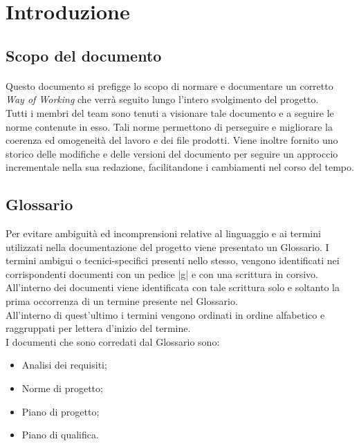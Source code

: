 \documentclass[10pt, a4paper]{article}
\title{\titolo}
\author{SWEetCode}
\begin{document}



\newpage

\tableofcontents
\newpage

\section{Introduzione}
\subsection{Scopo del documento}
\paragraph{}Questo documento si prefigge lo scopo di normare e documentare un corretto \textit{Way of Working} che verrà seguito lungo l'intero svolgimento del progetto.\\
	Tutti i membri del team sono tenuti a visionare tale documento e a seguire le norme contenute in esso. Tali norme permettono di perseguire e migliorare la coerenza ed omogeneità del lavoro e dei file prodotti.
	Viene inoltre fornito uno storico delle modifiche e delle versioni del documento per seguire un approccio incrementale nella sua redazione, facilitandone i cambiamenti nel corso del tempo.
\subsection{Glossario}
Per evitare ambiguità ed incomprensioni relative al linguaggio e ai termini utilizzati nella documentazione del progetto viene presentato un Glossario. I termini ambigui o tecnici-specifici presenti nello stesso, vengono identificati nei corrispondenti documenti con un pedice |g| e con una scrittura in corsivo.
All'interno dei documenti viene identificata con tale scrittura solo e soltanto la prima occorrenza di un termine presente nel Glossario.\\All'interno di quest'ultimo i termini vengono ordinati in ordine alfabetico e raggruppati per lettera d'inizio del termine.\\
I documenti che sono corredati dal Glossario sono:
\begin{itemize}
    \item Analisi dei requisiti;
    \item Norme di progetto;
    \item Piano di progetto;
    \item Piano di qualifica.
\end{itemize}
\end{document}
